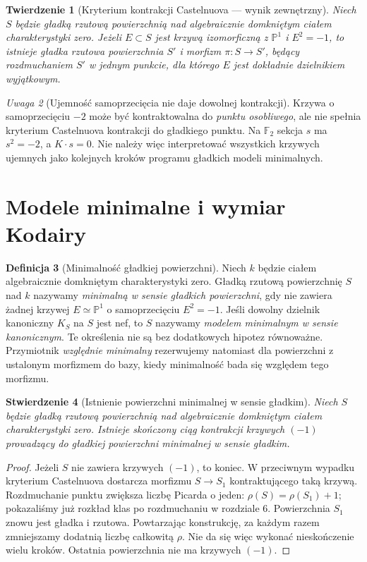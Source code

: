 \documentclass[11pt,a4paper,openany]{report}
\numberwithin{equation}{section}
\theoremstyle{plain}
\newtheorem{twierdzenie}{Twierdzenie}[section]
\newtheorem{stwierdzenie}[twierdzenie]{Stwierdzenie}
\theoremstyle{definition}
\newtheorem{definicja}[twierdzenie]{Definicja}
\theoremstyle{remark}
\newtheorem{uwaga}[twierdzenie]{Uwaga}
\newcommand{\PP}{\mathbb P}
\begin{document}
\begin{twierdzenie}[Kryterium kontrakcji Castelnuova — wynik zewnętrzny]
\label{tw:ga8-castelnuovo-mmp}
Niech $S$ będzie gładką rzutową powierzchnią nad
algebraicznie domkniętym ciałem charakterystyki zero.
Jeżeli $E\subset S$ jest krzywą izomorficzną z $\PP^1$
i $E^2=-1$, to istnieje gładka rzutowa powierzchnia
$S'$ i morfizm $\pi:S\to S'$, będący rozdmuchaniem
$S'$ w jednym punkcie, dla którego $E$ jest dokładnie
dzielnikiem wyjątkowym.
\end{twierdzenie}

\begin{uwaga}[Ujemność samoprzecięcia nie daje dowolnej kontrakcji]
Krzywa o samoprzecięciu $-2$ może być kontraktowalna
do \emph{punktu osobliwego}, ale nie spełnia kryterium
Castelnuova kontrakcji do gładkiego punktu.
Na $\mathbb F_2$ sekcja $s$ ma $s^2=-2$,
a $K\cdot s=0$. Nie należy więc interpretować
wszystkich krzywych ujemnych jako kolejnych kroków
programu gładkich modeli minimalnych.
\end{uwaga}

\section{Modele minimalne i wymiar Kodairy}
\label{sec:ga8-kodaira-minimal}

\begin{definicja}[Minimalność gładkiej powierzchni]
\label{def:ga8-minimal}
Niech $k$ będzie ciałem algebraicznie domkniętym
charakterystyki zero. Gładką rzutową powierzchnię
$S$ nad $k$ nazywamy
\emph{minimalną w sensie gładkich powierzchni},
gdy nie zawiera żadnej krzywej $E\simeq\PP^1$
o samoprzecięciu $E^2=-1$. Jeśli dowolny
dzielnik kanoniczny $K_S$ na $S$ jest nef, to $S$ nazywamy \emph{modelem minimalnym w sensie
kanonicznym}. Te określenia nie są bez dodatkowych
hipotez równoważne. Przymiotnik \emph{względnie minimalny}
rezerwujemy natomiast dla powierzchni z ustalonym morfizmem
do bazy, kiedy minimalność bada się względem tego morfizmu.
\end{definicja}

\begin{stwierdzenie}[Istnienie powierzchni minimalnej w sensie gładkim]
\label{st:ga8-terminate-minusone}
Niech $S$ będzie gładką rzutową powierzchnią nad
algebraicznie domkniętym ciałem charakterystyki zero.
Istnieje skończony ciąg kontrakcji krzywych $(-1)$
prowadzący do gładkiej powierzchni minimalnej w sensie gładkim.
\end{stwierdzenie}
\begin{proof}
Jeżeli $S$ nie zawiera krzywych $(-1)$, to koniec.
W przeciwnym wypadku kryterium Castelnuova dostarcza
morfizmu $S\to S_1$ kontraktującego taką krzywą.
Rozdmuchanie punktu zwiększa liczbę Picarda o jeden:
$\rho(S)=\rho(S_1)+1$; pokazaliśmy już rozkład
klas po rozdmuchaniu w rozdziale 6. Powierzchnia
$S_1$ znowu jest gładka i rzutowa. Powtarzając
konstrukcję, za każdym razem zmniejszamy dodatnią
liczbę całkowitą $\rho$. Nie da się więc wykonać
nieskończenie wielu kroków. Ostatnia powierzchnia
nie ma krzywych $(-1)$.
\end{proof}
\end{document}
